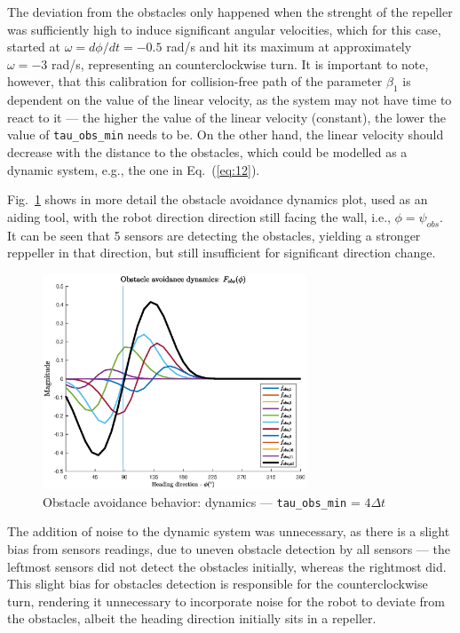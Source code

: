 The deviation from
the obstacles only happened when the strenght of the repeller was
sufficiently high to induce significant angular velocities, which for this case,
started at $\omega = d\phi/dt = -0.5$ rad/s and hit its maximum at approximately
$\omega = -3$ rad/s, representing an counterclockwise turn. It is important to note, however, that this calibration for
collision-free path of the parameter $\beta_1$ is dependent on the value of the
linear velocity, as the system may not have time to react to it --- the higher
the value of the linear velocity (constant), the lower the value of
\texttt{tau\_obs\_min} needs to be. On the other hand, the linear velocity
should decrease with the distance to the obstacles, which could be modelled as a
dynamic system, e.g., the one in Eq.~(\ref{eq:12}).

Fig.~\ref{fig:obs-scenario1-facing-front} shows in more detail the obstacle
avoidance dynamics plot, used as an aiding tool, with the robot direction
direction still facing the wall, i.e., $\phi = \psi_{obs}$. It can be seen that
5 sensors are detecting the obstacles, yielding a stronger reppeller in that
direction, but still insufficient for significant direction change.
%
\begin{figure}[!hbt]
\centering
    \includegraphics[width=0.7\textwidth]{./img/obs-scenario1-facing-front.eps}
  \caption{Obstacle avoidance behavior: dynamics --- \texttt{tau\_obs\_min} = $4 \Delta t$}%
\label{fig:obs-scenario1-facing-front}
\end{figure}

The addition of noise to the dynamic system was unnecessary, as there is a
slight bias from sensors readings, due to uneven obstacle detection by all
sensors --- the leftmost sensors did not detect the obstacles initially, whereas
the rightmost did. This slight bias for obstacles detection is responsible for
the counterclockwise turn, rendering it unnecessary to incorporate noise for the
robot to deviate from the obstacles, albeit the heading direction initially sits in a repeller.
%
%
